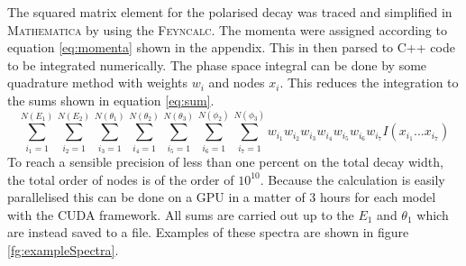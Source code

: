 The squared matrix element for the polarised decay was traced and simplified in \textsc{Mathematica} by using the \textsc{Feyncalc}. The momenta were assigned according to equation \ref{eq:momenta} shown in the appendix. This in then parsed to C++ code to be integrated numerically. The phase space integral can be done by some quadrature method with weights $w_i$ and nodes $x_i$. This reduces the integration to the sums shown in equation \ref{eq:sum}.
\begin{equation}
\sum_{i_1=1}^{N(E_1)} \sum_{i_2=1}^{N(E_2)} \sum_{i_3=1}^{N(\theta_1)}  \sum_{i_4=1}^{N(\theta_2)}  \sum_{i_5=1}^{N(\theta_3)}  \sum_{i_6=1}^{N(\phi_2)}  \sum_{i_7=1}^{N(\phi_3)} w_{i_1}w_{i_2}w_{i_3}w_{i_4}w_{i_5}w_{i_6}w_{i_7}I(x_{i_1}...x_{i_7})
\label{eq:sum}
\end{equation}
To reach a sensible precision of less than one percent on the total decay width, the total order of nodes is of the order of $10^{10}$. Because the calculation is easily parallelised this can be done on a GPU in a matter of 3 hours for each model with the \textsc{CUDA} framework. All sums are carried out up to the $E_1$ and $\theta_1$ which are instead saved to a file.
Examples of these spectra are shown in figure \ref{fg:exampleSpectra}.
